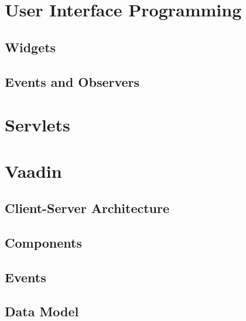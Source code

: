 \section{User Interface Programming}

\subsection{Widgets}

\subsection{Events and Observers}

\section{Servlets}

\section{Vaadin}

\subsection{Client-Server Architecture}

\subsection{Components}

\subsection{Events}

\subsection{Data Model}

